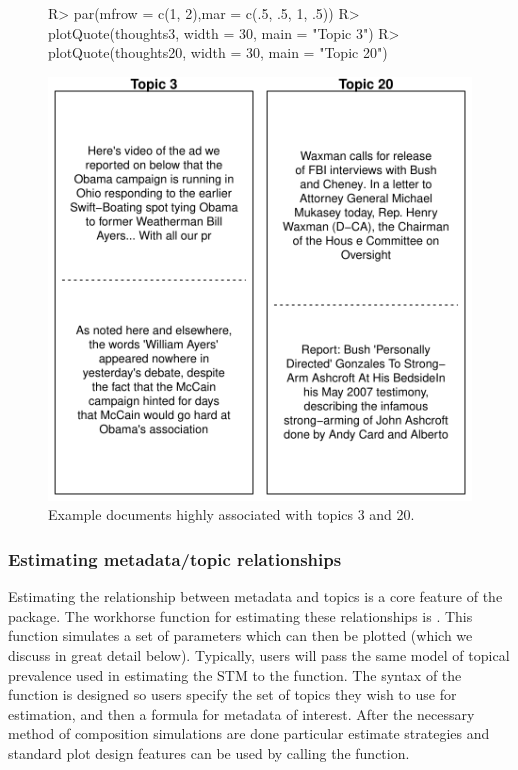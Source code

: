 \documentclass[article,shortnames]{jss}
\begin{document}


\begin{figure}
\begin{center}
\begin{Schunk}
\begin{Sinput}
R> par(mfrow = c(1, 2),mar = c(.5, .5, 1, .5))
R> plotQuote(thoughts3, width = 30, main = "Topic 3")
R> plotQuote(thoughts20, width = 30, main = "Topic 20")
\end{Sinput}
\end{Schunk}
\includegraphics{stmVignette-014}
\caption{Example documents highly associated with topics 3 and 20.}
\label{fig:example}
\end{center}
\end{figure}



\subsubsection{Estimating metadata/topic relationships}

Estimating the relationship between metadata and topics is a core feature of the  package. The workhorse function for estimating these relationships is . This function simulates a set of parameters which can then be plotted (which we discuss in great detail below). Typically, users will pass the same model of topical prevalence used in estimating the STM to the  function. The syntax of the  function is designed so users specify the set of topics they wish to use for estimation, and then a formula for metadata of interest. After the necessary method of composition simulations are done particular estimate strategies and standard plot design features can be used by calling the  function.
\end{document}
